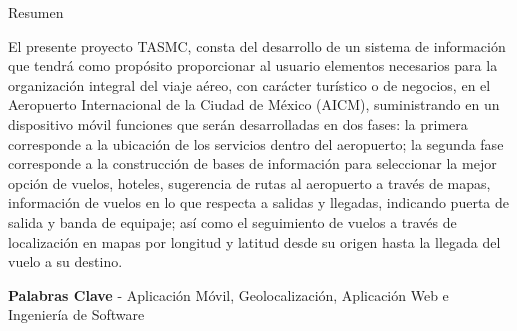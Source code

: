 \vspace{0.8cm}

\centerline{\Large Resumen}

El presente proyecto TASMC, consta del desarrollo de un sistema de información que tendrá como propósito proporcionar al usuario elementos necesarios para la organización integral del viaje aéreo, con carácter turístico o de negocios, en el Aeropuerto Internacional de la Ciudad de México (AICM), suministrando en un dispositivo móvil funciones que serán desarrolladas en dos fases: la primera corresponde a la ubicación de los servicios dentro del aeropuerto; la segunda fase corresponde a la construcción de bases de información para seleccionar la mejor opción  de vuelos, hoteles, sugerencia de rutas al aeropuerto a través de mapas, información de vuelos en lo que respecta a salidas y llegadas, indicando puerta de salida y banda de equipaje; así como el seguimiento de vuelos a través de localización en mapas por longitud y latitud desde su origen hasta la llegada del vuelo a su destino.

\vspace{0.2cm}

\centerline{\textbf{Palabras Clave }- Aplicación Móvil, Geolocalización, Aplicación Web e Ingeniería de Software}